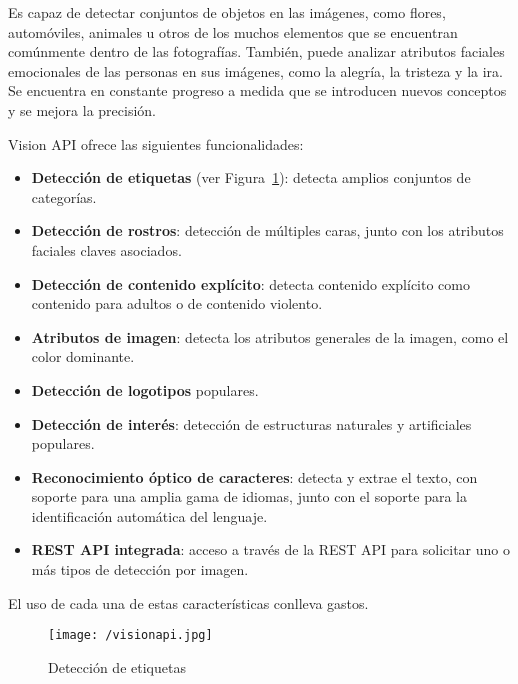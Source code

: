 Es capaz de detectar conjuntos de objetos en las imágenes, como flores, automóviles, animales u otros de los muchos elementos 
que se encuentran comúnmente dentro de las fotografías. También, puede analizar atributos faciales emocionales de las personas en sus imágenes, como la alegría, la tristeza y la ira. Se encuentra en constante progreso a medida que se introducen nuevos conceptos y se mejora la precisión.

Vision API ofrece las siguientes funcionalidades:
\begin{itemize}
\item \textbf{Detección de etiquetas} (ver Figura~\ref{fig:visionapi2}): detecta amplios conjuntos de categorías.
\item \textbf{Detección de rostros}: detección de múltiples caras, junto con los atributos faciales claves asociados.
\item \textbf{Detección de contenido explícito}: detecta contenido explícito como contenido para adultos o de contenido violento.
\item \textbf{Atributos de imagen}: detecta los atributos generales de la imagen, como el color dominante.
\item \textbf{Detección de logotipos} populares.
\item \textbf{Detección de interés}: detección de estructuras naturales y artificiales populares.
\item \textbf{Reconocimiento óptico de caracteres}: detecta y extrae el texto, con soporte para una amplia gama de idiomas, junto con el soporte para la identificación automática del lenguaje.
\item \textbf{REST API integrada}: acceso a través de la REST API para solicitar uno o más tipos de detección por imagen.
\end{itemize}

El uso de cada una de estas características conlleva gastos.

\begin{figure}[!h]
\begin{center}
\texttt{[image: /visionapi.jpg]}
\caption[Detección de etiquetas]{Detección de etiquetas}
\label{fig:visionapi2}
\end{center}
\end{figure}


